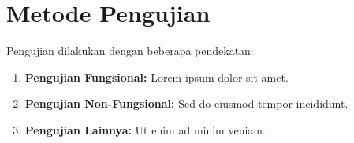\section{Metode Pengujian}


Pengujian dilakukan dengan beberapa pendekatan:

\begin{enumerate}
    \item \textbf{Pengujian Fungsional:} Lorem ipsum dolor sit amet.
    \item \textbf{Pengujian Non-Fungsional:} Sed do eiusmod tempor incididunt.
    \item \textbf{Pengujian Lainnya:} Ut enim ad minim veniam.
\end{enumerate}
